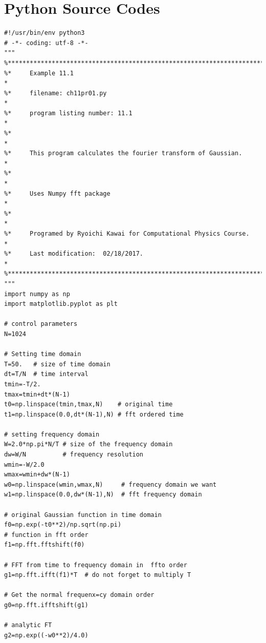 
\bigskip
\noindent
\section*{Python Source Codes}
\setcounter{program}{0}

\bigskip
\noindent
\program
\footnotesize
\begin{verbatim}
#!/usr/bin/env python3
# -*- coding: utf-8 -*-
"""
%**************************************************************************
%*     Example 11.1                                                       *
%*     filename: ch11pr01.py                                              *
%*     program listing number: 11.1                                       *
%*                                                                        *
%*     This program calculates the fourier transform of Gaussian.         *
%*                                                                        *
%*     Uses Numpy fft package                                             *
%*                                                                        *
%*     Programed by Ryoichi Kawai for Computational Physics Course.       *
%*     Last modification:  02/18/2017.                                    *
%**************************************************************************
"""
import numpy as np
import matplotlib.pyplot as plt

# control parameters
N=1024

# Setting time domain
T=50.   # size of time domain
dt=T/N  # time interval
tmin=-T/2.
tmax=tmin+dt*(N-1)
t0=np.linspace(tmin,tmax,N)    # original time
t1=np.linspace(0.0,dt*(N-1),N) # fft ordered time

# setting frequency domain
W=2.0*np.pi*N/T # size of the frequency domain
dw=W/N          # frequency resolution
wmin=-W/2.0
wmax=wmin+dw*(N-1)
w0=np.linspace(wmin,wmax,N)     # frequency domain we want
w1=np.linspace(0.0,dw*(N-1),N)  # fft frequency domain

# original Gaussian function in time domain
f0=np.exp(-t0**2)/np.sqrt(np.pi)
# function in fft order
f1=np.fft.fftshift(f0)

# FFT from time to frequency domain in  ffto order
g1=np.fft.ifft(f1)*T  # do not forget to multiply T

# Get the normal frequenx=cy domain order
g0=np.fft.ifftshift(g1)

# analytic FT
g2=np.exp((-w0**2)/4.0)


\end{verbatim}
